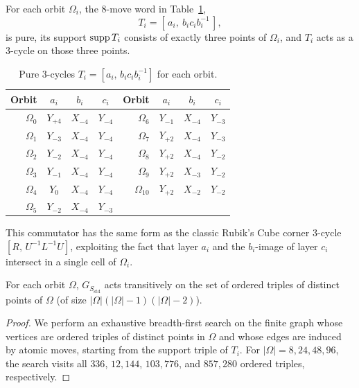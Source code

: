 \documentclass[a4paper,11pt]{article}
\begin{document}
\begin{proposition}[Check C6]\label{prop:threecycles}
For each orbit $\Omega_i$, the 8-move word in Table~\ref{tab:threecycles},
\[
T_i=[\,a_i,\ b_ic_ib_i^{-1}\,],
\]
is pure, its support $\operatorname{supp} T_i$ consists of exactly three points of $\Omega_i$, and $T_i$ acts as a 3-cycle on those three points.
\end{proposition}

\begin{table}[ht]
\centering
\caption{Pure 3-cycles $T_i=[a_i,\,b_ic_ib_i^{-1}]$ for each orbit.}\label{tab:threecycles}
\begin{tabular}{rccc@{\qquad}rccc}
\toprule
Orbit & $a_i$ & $b_i$ & $c_i$ & Orbit & $a_i$ & $b_i$ & $c_i$ \\
\midrule
$\Omega_0$ & $Y_{+4}$ & $X_{-4}$ & $Y_{-4}$ & $\Omega_6$ & $Y_{-1}$ & $X_{-4}$ & $Y_{-3}$ \\
$\Omega_1$ & $Y_{-3}$ & $X_{-4}$ & $Y_{-4}$ & $\Omega_7$ & $Y_{+2}$ & $X_{-4}$ & $Y_{-3}$ \\
$\Omega_2$ & $Y_{-2}$ & $X_{-4}$ & $Y_{-4}$ & $\Omega_8$ & $Y_{+2}$ & $X_{-4}$ & $Y_{-2}$ \\
$\Omega_3$ & $Y_{-1}$ & $X_{-4}$ & $Y_{-4}$ & $\Omega_9$ & $Y_{+2}$ & $X_{-3}$ & $Y_{-2}$ \\
$\Omega_4$ & $Y_{0}$ & $X_{-4}$ & $Y_{-4}$ & $\Omega_{10}$ & $Y_{+2}$ & $X_{-2}$ & $Y_{-2}$ \\
$\Omega_5$ & $Y_{-2}$ & $X_{-4}$ & $Y_{-3}$ & & & & \\
\bottomrule
\end{tabular}
\end{table}

This commutator has the same form as the classic Rubik's Cube corner 3-cycle $[R,\,U^{-1}L^{-1}U]$, exploiting the fact that layer $a_i$ and the $b_i$-image of layer $c_i$ intersect in a single cell of $\Omega_i$.

\begin{proposition}\label{prop:transitive}
For each orbit $\Omega$, $G_{S_{\mathrm{std}}}$ acts transitively on the set of ordered triples of distinct points of $\Omega$ (of size $|\Omega|(|\Omega|-1)(|\Omega|-2)$).
\end{proposition}

\begin{proof}
We perform an exhaustive breadth-first search on the finite graph whose vertices are ordered triples of distinct points in $\Omega$ and whose edges are induced by atomic moves, starting from the support triple of $T_i$.
For $|\Omega|=8,24,48,96$, the search visits all $336$, $12{,}144$, $103{,}776$, and $857{,}280$ ordered triples, respectively.
\end{proof}
\end{document}
